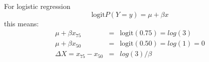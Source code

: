 For logistic regression 
\begin{equation} 
\label{mod.logistic}
\text{logit} P(Y = y) = \mu + \beta x
\end{equation}
this means:
\begin{eqnarray}\nonumber
\mu + \beta x_{75} &=& \text{logit}(0.75) = log(3) \\ \nonumber
\mu + \beta x_{50} &=& \text{logit} (0.50) = log(1) = 0 \\ \label{jnd.logistic}
\Delta X = x_{75} - x_{50} &=& log(3)/\beta
\end{eqnarray}

% 
% 






